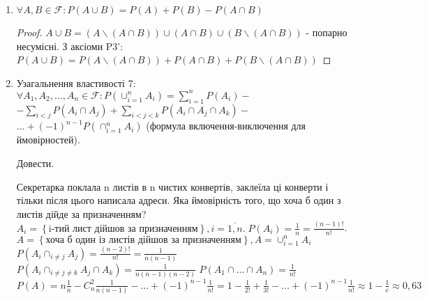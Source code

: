 \begin{enumerate}
    \begin{proof}
        Наслідок з властивості 4.
    \end{proof}
    \item $\forall A, B \in \mathcal{F}: P(A \cup B) = P(A) + P(B) - P(A \cap B)$
    \begin{proof}
        $A \cup B = (A\backslash(A \cap B)) 
        \cup (A \cap B) 
        \cup (B\backslash(A \cap B))$ - попарно несумісні. 
        \newline
        З аксіоми P3': $P(A \cup B) = P(A\backslash(A \cap B)) 
        + P(A \cap B) 
        + P(B\backslash(A \cap B))$
    \end{proof}
    \item Узагальнення властивості 7: $\forall A_1, A_2, \dots, A_n \in \mathcal{F} 
    : P(\cup_{i=1}^n A_i) = \sum_{i=1}^n P(A_i) -$
    \newline
    $- \sum_{i < j}P(A_i \cap A_j) + \sum_{i < j < k}P(A_i \cap A_j \cap A_k) - $
    $\dots +(-1)^{n-1}P(\cap_{i=1}^n A_i)$
    \newline
    (формула включення-виключення для ймовірностей).
    \begin{exercise}
        Довести.
    \end{exercise}
\begin{example}
    Секретарка поклала n листів в n чистих конвертів, заклеїла ці конверти і тільки 
    після цього написала адреси. Яка ймовірність того, що хоча б один з листів дійде 
    за призначенням?
    \newline
    $A_i = \left\{\text{i-тий лист дійшов за призначенням}\right\}, i = 
    \overline{1,n}. \;P(A_i) = \frac{1}{n} = \frac{(n-1)!}{n!}$.
    \newline
    $A = \left\{\text{хоча б один із листів дійшов за призначенням}\right\}, 
    A = \cup_{i=1}^n A_i$
    \newline
    $P(A_i \cap_{i \neq j} A_j) = \frac{(n-2)!}{n!} = \frac{1}{n(n-1)}$
    \newline
    $P(A_i \cap_{i \neq j \neq k} A_j \cap A_k) = \frac{1}{n(n-1)(n-2)}$
    \newline
    $P(A_1 \cap \dots \cap A_n) = \frac{1}{n!}$
    \newline
    $P(A) = n\frac{1}{n} - C_n^2\frac{1}{n(n-1)}- \dots + (-1)^{n-1}\frac{1}{n!}
    = 1 - \frac{1}{2!} + \frac{1}{3!} - \dots +(-1)^{n-1}\frac{1}{n!} \approx 
    1 - \frac{1}{e} \approx 0,63$
\end{example}

\end{enumerate}
